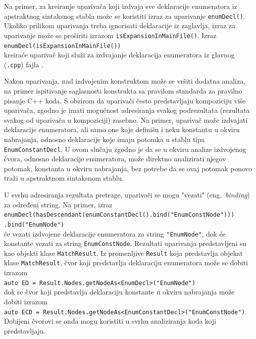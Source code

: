 \documentclass[12pt,oneside]{memoir}
\begin{document}
\par
Na primer, za kreiranje upariva\v{c}a koji izdvaja sve deklaracije enumeratora iz apstraktnog sintaksnog stabla mo\v{z}e se koristiti izraz za uparivanje \texttt{enumDecl()}. Ukoliko prilikom uparivanja treba ignorisati deklaracije iz zaglavlja, izraz za uparivanje mo\v{z}e se pro\v{s}iriti izrazom \texttt{isExpansionIn\-MainFile()}. Izraz \\ \texttt{enumDecl(isExpansionInMainFile())} \\ kreira\'{c}e upariva\v{c} koji slu\v{z}i za izdvajanje deklaracija enumeratora iz glavnog (\texttt{.cpp}) fajla \cite{ASTMatcherReference, MatchingClangAST}.

Nakon uparivanja, nad izdvojenim konstruktom mo\v{z}e se vr\v{s}iti dodatna analiza, na primer ispitivanje saglasnosti konstrukta sa pravilom standarda za pravilno pisanje C++ koda.
S obzirom da upariva\v{c}i \v{c}esto predstavljaju kompoziciju vi\v{s}e upariva\v{c}a, zgodno je imati mogu\'{c}nost adresiranja svakog podrezultata (rezultata svakog od upariva\v{c}a u kompoziciji) zasebno. Na primer, upariva\v{c} mo\v{z}e izdvajati deklaracije enumeratora, ali samo one koje defini\v{s}u i neku konstantu u okviru nabrajanja, odnosno deklaracije koje imaju potomka u stablu tipa \texttt{EnumConstantDecl}. U ovom slu\v{c}aju
zgodno je da se u okviru analize izdvojenog \v{c}vora, odnosno deklaracije enumeratora, mo\v{z}e direktno analizirati njegov potomak, konstanta u okviru nabrajanja, bez potrebe da se ovaj potomak ponovo tra\v{z}i u apstraktnom sintaksnom stablu.

U svrhu adresiranja rezultata pretrage, upariva\v{c}i se mogu "vezati" (eng.~\textit{binding}) za određeni string. Na primer, izraz \\
\texttt{enumDecl(hasDescendant(enumConstantDecl().bind("EnumConstNode")))} \\
\hspace*{9cm}\texttt{.bind("EnumNode")} \\ će vezati izdvojene deklaracije enumeratora za string \texttt{"EnumNode"}, dok \'{c}e konstante vezati za string \texttt{EnumConstNode}. Rezultati uparivanja predstavljeni su kao objekti klase \texttt{MatchResult}. Iz promenljive \texttt{Result} koja predstavlja objekat klase \texttt{MatchResult}, \v{c}vor koji predstavlja deklaraciju enumeratora
mo\v{z}e se dobiti izrazom \\ \texttt{auto ED = Result.Nodes.getNodeAs<EnumDecl>("EnumNode")} \\
dok se \v{c}vor koji predstavlja deklaraciju konstante u okviru nabrajanja mo\v{z}e dobiti izrazom \\ \texttt{auto ECD = Result.Nodes.getNodeAs<EnumConstantDecl>("EnumConstNode")}.\\ Dobijeni \v{c}vorovi se onda mogu koristiti u svrhu analiziranja
koda koji predstavljaju.
\end{document}
